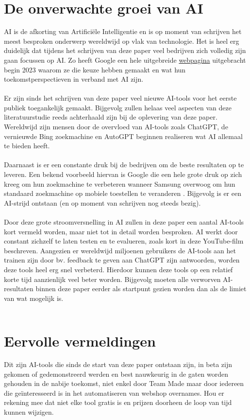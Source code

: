 \section{De onverwachte groei van AI}
AI is de afkorting van Artificiële Intelligentie en is op moment van schrijven het meest besproken onderwerp wereldwijd op vlak van technologie. Het is heel erg duidelijk dat tijdens het schrijven van deze paper veel bedrijven zich volledig zijn gaan focussen op AI. Zo heeft Google een hele uitgebreide \href{https://ai.google/why-ai/}{webpagina} uitgebracht begin 2023 waarom ze die keuze hebben gemaakt en wat hun toekomstperspectieven in verband met AI zijn.
\\\\
Er zijn sinds het schrijven van deze paper veel nieuwe AI-tools voor het eerste publiek toegankelijk gemaakt. Bijgevolg zullen helaas veel aspecten van deze literatuurstudie reeds achterhaald zijn bij de oplevering van deze paper. Wereldwijd zijn mensen door de overvloed van AI-tools zoals ChatGPT, de vernieuwde Bing zoekmachine en AutoGPT beginnen realiseren wat AI allemaal te bieden heeft.
\\\\
Daarnaast is er een constante druk bij de bedrijven om de beste resultaten op te leveren. Een bekend voorbeeld hiervan is Google die een hele grote druk op zich kreeg om hun zoekmachine te verbeteren wanneer Samsung overwoog om hun standaard zoekmachine op mobiele toestellen te veranderen \autocite{Paris2023}. Bijgevolg is er een AI-strijd ontstaan (en op moment van schrijven nog steeds bezig). 
\\\\
Door deze grote stroomversnelling in AI zullen in deze paper een aantal AI-tools kort vermeld worden, maar niet tot in detail worden besproken. AI werkt door constant zichzelf te laten testen en te evalueren, zoals kort in deze YouTube-film \autocite{Grey2017} beschreven. Aangezien er wereldwijd miljoenen gebruikers de AI-tools aan het trainen zijn door bv. feedback te geven aan ChatGPT zijn antwoorden, worden deze tools heel erg snel verbeterd. Hierdoor kunnen deze tools op een relatief korte tijd aanzienlijk veel beter worden. Bijgevolg moeten alle verworven AI-resultaten binnen deze paper eerder als startpunt gezien worden dan als de limiet van wat mogelijk is.
\\\\
\section{Eervolle vermeldingen}
Dit zijn AI-tools die sinds de start van deze paper ontstaan zijn, in beta zijn gekomen of gedemonstreerd werden en best nauwkeurig in de gaten worden gehouden in de nabije toekomst, niet enkel door Team Made maar door iedereen die geïnteresseerd is in het automatiseren van webshop overnames. Hou er rekening mee dat niet elke tool gratis is en prijzen doorheen de loop van tijd kunnen wijzigen.
